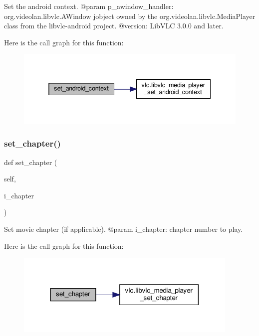 \begin{DoxyVerb}Set the android context.
@param p_awindow_handler: org.videolan.libvlc.AWindow jobject owned by the org.videolan.libvlc.MediaPlayer class from the libvlc-android project.
@version: LibVLC 3.0.0 and later.
\end{DoxyVerb}
 Here is the call graph for this function\+:
\nopagebreak
\begin{figure}[H]
\begin{center}
\leavevmode
\includegraphics[width=338pt]{classvlc_1_1_media_player_aa5b3842814a612f4999f1bc01f95b6d4_cgraph}
\end{center}
\end{figure}
\mbox{\label{classvlc_1_1_media_player_a8f1cc1f22ccb1a6f6d592782538decf3}} 
\subsubsection{\texorpdfstring{set\+\_\+chapter()}{set\_chapter()}}
{\footnotesize\ttfamily def set\+\_\+chapter (\begin{DoxyParamCaption}\item[{}]{self,  }\item[{}]{i\+\_\+chapter }\end{DoxyParamCaption})}

\begin{DoxyVerb}Set movie chapter (if applicable).
@param i_chapter: chapter number to play.
\end{DoxyVerb}
 Here is the call graph for this function\+:
\nopagebreak
\begin{figure}[H]
\begin{center}
\leavevmode
\includegraphics[width=302pt]{classvlc_1_1_media_player_a8f1cc1f22ccb1a6f6d592782538decf3_cgraph}
\end{center}
\end{figure}
\mbox{\label{classvlc_1_1_media_player_a161a0eb8d93f38fa2204be0c3a51bdbd}} 
